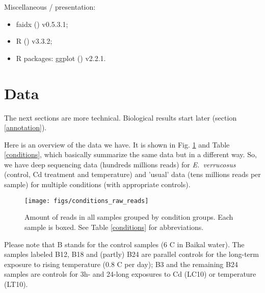 \documentclass[12pt]{article}
\begin{document}
\noindent Miscellaneous / presentation:
\begin{itemize}
\item faidx (\cite{Shirley2015}) v0.5.3.1;
\item R (\cite{RCoreTeam2017}) v3.3.2; 
\item R packages: ggplot (\cite{Wickham2009}) v2.2.1. 
\end{itemize}

\newpage

\section{Data} \label{Data}
		The next sections are more technical. Biological results start later (section \ref{annotation}).

Here is an overview of the data we have. It is shown in Fig. \ref{conditions_raw_reads} and Table \ref{conditions}, which basically summarize the same data but in a different way. So, we have deep sequencing data (hundreds millions reads) for \textit{E.~verrucosus} (control, Cd treatment and temperature) and 'usual' data (tens millions reads per sample) for multiple conditions (with appropriate controls). 

\begin{figure}[H]
\texttt{[image: figs/conditions\_raw\_reads]}
\caption{Amount of reads in all samples grouped by condition groups. Each sample is boxed. See Table \ref{conditions} for abbreviations. }
\label{conditions_raw_reads}
\end{figure}

Please note that B stands for the control samples (6 \textdegree C in Baikal water). The samples labeled B12, B18 and (partly) B24 are parallel controls for the long-term exposure to rising temperature (0.8 \textdegree C per day); B3 and the remaining B24 samples are controls for 3h- and 24-long exposures to Cd (LC10) or temperature (LT10). 
		
\end{document}
